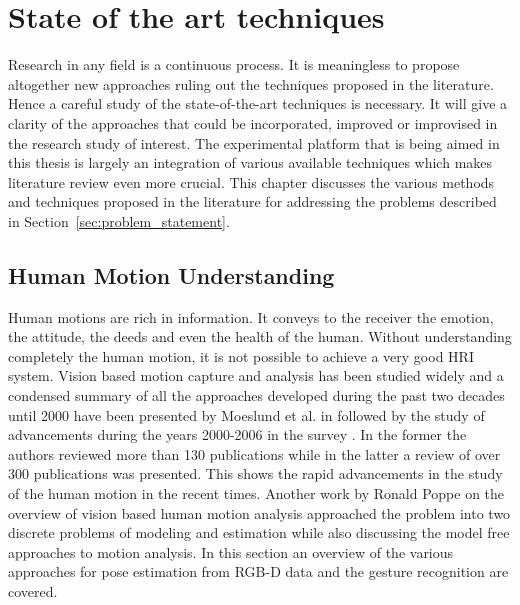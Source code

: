 \chapter{State of the art techniques}

\label{Chapter3} %


  Research in any field is a continuous process. It is meaningless to propose altogether new approaches ruling out the techniques proposed in the literature. Hence a careful study of the state-of-the-art techniques is necessary. It will give a clarity of the approaches that could be incorporated, improved or improvised in the research study of interest. The experimental platform that is being aimed in this thesis is largely an integration of various available techniques which makes literature review even more crucial. This chapter discusses the various methods and techniques proposed in the literature for addressing the problems described in Section~\ref{sec:problem_statement}.

\section{Human Motion Understanding} %
 Human motions are rich in information. It conveys to the receiver the emotion, the attitude, the deeds and even the health of the human. Without understanding completely the human motion, it is not possible to achieve a very good HRI system.  Vision based motion capture and analysis has been studied widely and a condensed summary of all the approaches developed during the past two decades until 2000 have been presented by Moeslund et al. in \cite{Moeslund2001231} followed by the study of advancements during the years 2000-2006 in the survey \cite{Moeslund200690}. In the former the authors reviewed more than 130 publications while in the latter a review of over 300 publications was presented. This shows the rapid advancements in the study of the human motion in the recent times. Another work by Ronald Poppe \cite{Poppe20074} on the overview of vision based human motion analysis approached the problem into two discrete problems of modeling and estimation while also discussing the model free approaches to motion analysis. In this section an overview of the various approaches for pose estimation from RGB-D data and the gesture recognition are covered.
